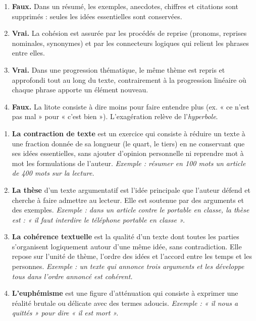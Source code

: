 \documentclass[11pt]{article}
\newcommand{\cle}[1]{{\popxbold\color{popdark}#1}}
\begin{document}
\begin{corrige}
\begin{enumerate}
\item \textbf{Faux.} Dans un résumé, les exemples, anecdotes, chiffres et citations sont supprimés : seules les idées essentielles sont conservées.
\item \textbf{Vrai.} La \cle{cohésion} est assurée par les procédés de reprise (pronoms, reprises nominales, synonymes) et par les connecteurs logiques qui relient les phrases entre elles.
\item \textbf{Vrai.} Dans une \cle{progression thématique}, le même thème est repris et approfondi tout au long du texte, contrairement à la progression linéaire où chaque phrase apporte un élément nouveau.
\item \textbf{Faux.} La \cle{litote} consiste à dire moins pour faire entendre plus (ex. « ce n'est pas mal » pour « c'est bien »). L'exagération relève de l'\emph{hyperbole}.
\end{enumerate}
\end{corrige}

\begin{corrige}
\begin{enumerate}
\item \textbf{La contraction de texte} est un exercice qui consiste à réduire un texte à une fraction donnée de sa longueur (le quart, le tiers) en ne conservant que ses idées essentielles, sans ajouter d'opinion personnelle ni reprendre mot à mot les formulations de l'auteur. \emph{Exemple : résumer en 100 mots un article de 400 mots sur la lecture.}
\item \textbf{La thèse} d'un texte argumentatif est l'idée principale que l'auteur défend et cherche à faire admettre au lecteur. Elle est soutenue par des arguments et des exemples. \emph{Exemple : dans un article contre le portable en classe, la thèse est : « il faut interdire le téléphone portable en classe ».}
\item \textbf{La cohérence textuelle} est la qualité d'un texte dont toutes les parties s'organisent logiquement autour d'une même idée, sans contradiction. Elle repose sur l'unité de thème, l'ordre des idées et l'accord entre les temps et les personnes. \emph{Exemple : un texte qui annonce trois arguments et les développe tous dans l'ordre annoncé est cohérent.}
\item \textbf{L'euphémisme} est une figure d'atténuation qui consiste à exprimer une réalité brutale ou délicate avec des termes adoucis. \emph{Exemple : « il nous a quittés » pour dire « il est mort ».}
\end{enumerate}
\end{corrige}
\end{document}
